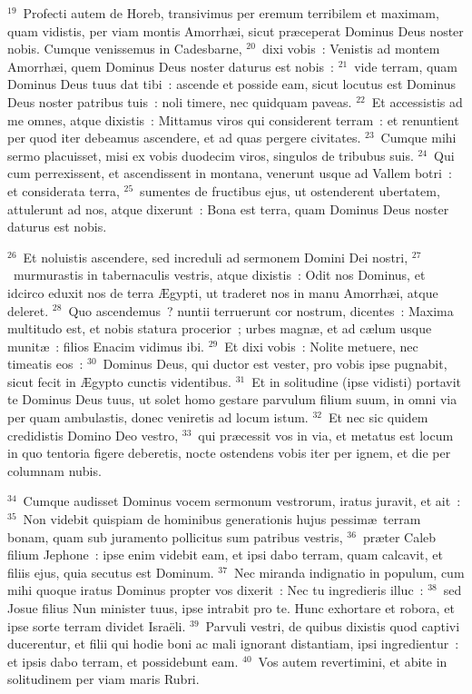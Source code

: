 ${}^{19}$~Profecti autem de Horeb, transivimus per eremum terribilem et maximam, quam vidistis, per viam montis Amorrh\ae i, sicut pr\ae ceperat Dominus Deus noster nobis. Cumque venissemus in Cadesbarne,
${}^{20}$~dixi vobis~: Venistis ad montem Amorrh\ae i, quem Dominus Deus noster daturus est nobis~:
${}^{21}$~vide terram, quam Dominus Deus tuus dat tibi~: ascende et posside eam, sicut locutus est Dominus Deus noster patribus tuis~: noli timere, nec quidquam paveas.
${}^{22}$~Et accessistis ad me omnes, atque dixistis~: Mittamus viros qui considerent terram~: et renuntient per quod iter debeamus ascendere, et ad quas pergere civitates.
${}^{23}$~Cumque mihi sermo placuisset, misi ex vobis duodecim viros, singulos de tribubus suis.
${}^{24}$~Qui cum perrexissent, et ascendissent in montana, venerunt usque ad Vallem botri~: et considerata terra,
${}^{25}$~sumentes de fructibus ejus, ut ostenderent ubertatem, attulerunt ad nos, atque dixerunt~: Bona est terra, quam Dominus Deus noster daturus est nobis.


${}^{26}$~Et noluistis ascendere, sed increduli ad sermonem Domini Dei nostri,
${}^{27}$~murmurastis in tabernaculis vestris, atque dixistis~: Odit nos Dominus, et idcirco eduxit nos de terra \AE gypti, ut traderet nos in manu Amorrh\ae i, atque deleret.
${}^{28}$~Quo ascendemus~? nuntii terruerunt cor nostrum, dicentes~: Maxima multitudo est, et nobis statura procerior~; urbes magn\ae , et ad c\ae lum usque munit\ae~: filios Enacim vidimus ibi.
${}^{29}$~Et dixi vobis~: Nolite metuere, nec timeatis eos~:
${}^{30}$~Dominus Deus, qui ductor est vester, pro vobis ipse pugnabit, sicut fecit in \AE gypto cunctis videntibus.
${}^{31}$~Et in solitudine (ipse vidisti) portavit te Dominus Deus tuus, ut solet homo gestare parvulum filium suum, in omni via per quam ambulastis, donec veniretis ad locum istum.
${}^{32}$~Et nec sic quidem credidistis Domino Deo vestro,
${}^{33}$~qui pr\ae cessit vos in via, et metatus est locum in quo tentoria figere deberetis, nocte ostendens vobis iter per ignem, et die per columnam nubis.


${}^{34}$~Cumque audisset Dominus vocem sermonum vestrorum, iratus juravit, et ait~:
${}^{35}$~Non videbit quispiam de hominibus generationis hujus pessim\ae\ terram bonam, quam sub juramento pollicitus sum patribus vestris,
${}^{36}$~pr\ae ter Caleb filium Jephone~: ipse enim videbit eam, et ipsi dabo terram, quam calcavit, et filiis ejus, quia secutus est Dominum.
${}^{37}$~Nec miranda indignatio in populum, cum mihi quoque iratus Dominus propter vos dixerit~: Nec tu ingredieris illuc~:
${}^{38}$~sed Josue filius Nun minister tuus, ipse intrabit pro te. Hunc exhortare et robora, et ipse sorte terram dividet Isra\"eli.
${}^{39}$~Parvuli vestri, de quibus dixistis quod captivi ducerentur, et filii qui hodie boni ac mali ignorant distantiam, ipsi ingredientur~: et ipsis dabo terram, et possidebunt eam.
${}^{40}$~Vos autem revertimini, et abite in solitudinem per viam maris Rubri.


